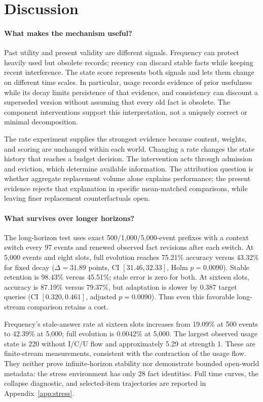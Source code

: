 \section{Discussion}\label{sec:discussion}
\paragraph{What makes the mechanism useful?}
Past utility and present validity are different signals. Frequency can protect heavily used but obsolete records; recency can discard stable facts while keeping recent interference. The state score represents both signals and lets them change on different time scales. In particular, usage records evidence of prior usefulness while its decay limits persistence of that evidence, and consistency can discount a superseded version without assuming that every old fact is obsolete. The component interventions support this interpretation, not a uniquely correct or minimal decomposition.

The rate experiment supplies the strongest evidence because content, weights, and scoring are unchanged within each world. Changing a rate changes the state history that reaches a budget decision. The intervention acts through admission and eviction, which determine available information. The attribution question is whether aggregate replacement volume alone explains performance; the present evidence rejects that explanation in specific mean-matched comparisons, while leaving finer replacement counterfactuals open.

\paragraph{What survives over longer horizons?}
The long-horizon test uses exact 500/1,000/5,000-event prefixes with a context switch every 97 events and renewed observed fact revisions after each switch. At 5,000 events and eight slots, full evolution reaches 75.21\% accuracy versus 43.32\% for fixed decay ($\Delta=31.89$ points, CI $[31.46,32.33]$, Holm $p=0.0090$). Stable retention is 98.43\% versus 45.51\%; stale error is zero for both. At sixteen slots, accuracy is 87.19\% versus 79.37\%, but adaptation is slower by 0.387 target queries (CI $[0.320,0.461]$, adjusted $p=0.0090$). Thus even this favorable long-stream comparison retains a cost.

Frequency's stale-answer rate at sixteen slots increases from 19.09\% at 500 events to 42.39\% at 5,000; full evolution is 0.0042\% at 5,000. The largest observed usage state is 220 without I/C/U flow and approximately 5.29 at strength 1. These are finite-stream measurements, consistent with the contraction of the usage flow. They neither prove infinite-horizon stability nor demonstrate bounded open-world metadata: the stress environment has only 28 fact identities. Full time curves, the collapse diagnostic, and selected-item trajectories are reported in Appendix~\ref{app:stress}.

